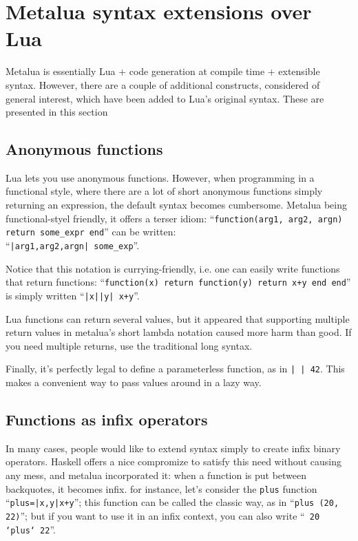 \section[Metalua extensions]{Metalua syntax extensions over Lua}
Metalua is essentially Lua + code generation at compile time +
extensible syntax. However, there are a couple of additional
constructs, considered of general interest, which have been added to
Lua's original syntax. These are presented in this section

\subsection{Anonymous functions}
Lua lets you use anonymous functions. However, when programming in a
functional style, where there are a lot of short anonymous functions
simply returning an expression, the default syntax becomes
cumbersome. Metalua being functional-styel friendly, it offers a
terser idiom: ``{\tt function(arg1, arg2, argn) return some\_expr
  end}'' can be written:\\
``{\tt|arg1,arg2,argn| some\_exp}''.

Notice that this notation is currying-friendly, i.e. one can easily
write functions that return functions: ``{\tt function(x) return
function(y) return x+y end end}'' is simply written ``{\tt|x||y|
x+y}''.

Lua functions can return several values, but it appeared that
supporting multiple return values in metalua's short lambda notation
caused more harm than good. If you need multiple returns, use the
traditional long syntax.

Finally, it's perfectly legal to define a parameterless function, as
in {\tt | | 42}. This makes a convenient way to pass values around in a
lazy way.

\subsection{Functions as infix operators}

In many cases, people would like to extend syntax simply to create
infix binary operators. Haskell offers a nice compromize to satisfy
this need without causing any mess, and metalua incorporated it: when
a function is put between backquotes, it becomes infix. for instance,
let's consider the {\tt plus} function ``{\tt plus=|x,y|x+y}''; this
function can be called the classic way, as in ``{\tt plus (20, 22)}''; but
if you want to use it in an infix context, you can also write ``{\tt
20 `plus` 22}''.


